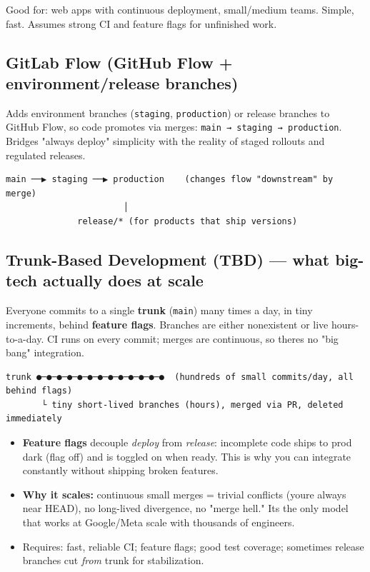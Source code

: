 \documentclass[11pt]{article}
\providecommand{\tightlist}{\setlength{\itemsep}{1pt}\setlength{\parskip}{0pt}}
\begin{document}
Good for: web apps with continuous deployment, small/medium teams. Simple, fast. Assumes strong CI and feature flags for unfinished work.

\subsection{GitLab Flow (GitHub Flow + environment/release branches)}\label{gitlab-flow-github-flow--environmentrelease-branches}

Adds environment branches (\texttt{staging}, \texttt{production}) or release branches to GitHub Flow, so code promotes via merges: \texttt{main\ →\ staging\ →\ production}. Bridges "always deploy" simplicity with the reality of staged rollouts and regulated releases.

\setcodelang{}

\begin{verbatim}
main ──▶ staging ──▶ production    (changes flow "downstream" by merge)
                       │
              release/* (for products that ship versions)
\end{verbatim}

\subsection{Trunk-Based Development (TBD) --- what big-tech actually does at scale}\label{trunk-based-development-tbd--what-big-tech-actually-does-at-scale}

Everyone commits to a single \textbf{trunk} (\texttt{main}) many times a day, in tiny increments, behind \textbf{feature flags}. Branches are either nonexistent or live hours-to-a-day. CI runs on every commit; merges are continuous, so there\textquotesingle s no "big bang" integration.

\setcodelang{}

\begin{verbatim}
trunk ●─●─●─●─●─●─●─●─●─●─●─●─●  (hundreds of small commits/day, all behind flags)
       └ tiny short-lived branches (hours), merged via PR, deleted immediately
\end{verbatim}

\begin{itemize}
\tightlist
\item
  \textbf{Feature flags} decouple \emph{deploy} from \emph{release}: incomplete code ships to prod dark (flag off) and is toggled on when ready. This is why you can integrate constantly without shipping broken features.
\item
  \textbf{Why it scales:} continuous small merges = trivial conflicts (you\textquotesingle re always near HEAD), no long-lived divergence, no "merge hell." It\textquotesingle s the only model that works at Google/Meta scale with thousands of engineers.
\item
  Requires: fast, reliable CI; feature flags; good test coverage; sometimes release branches cut \emph{from} trunk for stabilization.
\end{itemize}
\end{document}
